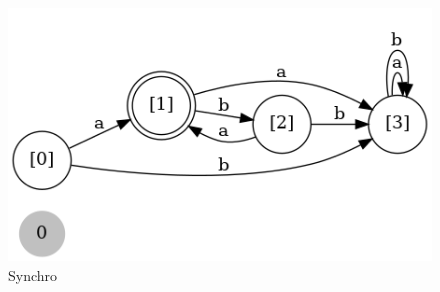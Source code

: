 \documentclass[]{article}
\begin{document}
\begin{enumerate}
\begin{figure}[htbp]
            \includegraphics[width=15cm]{automateSynchro.png}
            \caption{Synchro}\label{fig:3.1}
        \end{figure}\\
    \end{enumerate}
    \setcounter{section}{0}
    \newpage
\end{document}
